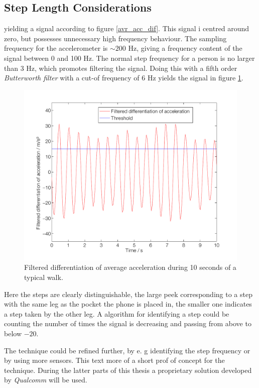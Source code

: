 \documentclass{LTHthesis}
\begin{document}
\subsection{Step Length Considerations}
%
yielding a signal according to figure \ref{avr_acc_dif}. This signal i centred around zero, but possesses unnecessary high frequency behaviour. The sampling frequency for the accelerometer is $\sim 200$ Hz, giving a frequency content of the signal between 0 and 100 Hz. The normal step frequency for a person is no larger than 3 Hz, which promotes filtering the signal. Doing this with a fifth order \emph{Butterworth filter} with a cut-of frequency of 6 Hz yields the signal in figure \ref{avr_acc_dif_filt}.
%
\begin{figure}[!hbt]

\includegraphics[width=1\textwidth ]{images/kinematic/avr_acc_dif_filt}
\caption{Filtered differentiation of average acceleration during 10 seconds of a typical walk.}\label{avr_acc_dif_filt}
\end{figure}
%
Here the steps are clearly distinguishable, the large peek corresponding to a step with the same leg as the pocket the phone is placed in, the smaller one indicates a step taken by the other leg. A algorithm for identifying a step could be counting the number of times  the signal is decreasing and passing from above to below $-20$.

The technique could be refined further, by e. g identifying the step frequency or by using more sensors. This text more of a short prof of concept for the technique. During the latter parts of this thesis a proprietary solution developed by \emph{Qualcomm} will be used. 
%
\end{document}
